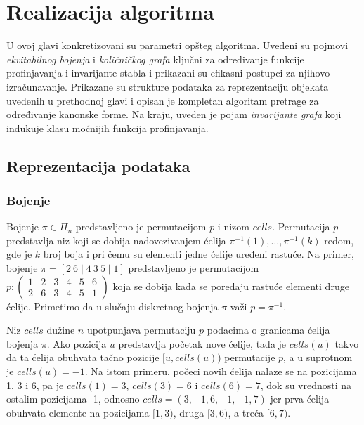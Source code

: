 \documentclass[12pt,oneside]{memoir}
\theoremstyle{definition}
\begin{document}
\chapter{Realizacija algoritma}

 U ovoj glavi konkretizovani su parametri opšteg algoritma.  Uvedeni su pojmovi
 \emph{ekvitabilnog bojenja} i \emph{količničkog grafa} ključni za određivanje
 funkcije profinjavanja i invarijante stabla i prikazani su efikasni postupci
 za njihovo izračunavanje.  Prikazane su strukture podataka za reprezentaciju
 objekata uvedenih u prethodnoj glavi i opisan je kompletan algoritam pretrage
 za određivanje kanonske forme. Na kraju, uveden je pojam \emph{invarijante
 grafa} koji indukuje klasu moćnijih funkcija profinjavanja.

 \section{Reprezentacija podataka}

  \subsection{Bojenje}

   Bojenje $\pi \in \Pi_n$ predstavljeno je permutacijom $p$ i nizom $cells$.
   Permutacija $p$ predstavlja niz koji se dobija nadovezivanjem ćelija
   $\pi^{-1}(1), \dots, \pi^{-1}(k)$ redom, gde je $k$ broj boja i pri čemu su
   elementi jedne ćelije uređeni rastuće. Na primer, bojenje $\pi = [2\ 6 \mid
   4\ 3\ 5 \mid 1]$ predstavljeno je permutacijom $p : \begin{pmatrix} 1 & 2 &
   3 & 4 & 5 & 6\\ 2 & 6 & 3 & 4 & 5 & 1 \end{pmatrix}$ koja se dobija kada se
   poređaju rastuće elementi druge ćelije. Primetimo da u slučaju diskretnog
   bojenja $\pi$ važi $p = \pi^{-1}$.

   Niz $cells$ dužine $n$ upotpunjava permutaciju $p$ podacima o granicama
   ćelija bojenja $\pi$. Ako pozicija $u$ predstavlja početak nove ćelije, tada
   je $cells(u)$ takvo da ta ćelija obuhvata tačno pozicije $[u, cells(u))$
   permutacije $p$, a u suprotnom je $cells(u) = -1$. Na istom primeru, počeci
   novih ćelija nalaze se na pozicijama 1, 3 i 6, pa je $cells(1) = 3$, $cells(3)
   = 6$ i $cells(6) = 7$, dok su vrednosti na ostalim pozicijama -1, odnosno
   $cells = (3, -1, 6, -1, -1, 7)$ jer prva ćelija obuhvata elemente na
   pozicijama $[1,3)$, druga $[3,6)$, a treća $[6,7)$.
   
\end{document}
